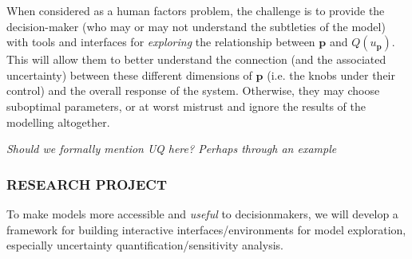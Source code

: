 \documentclass[a4paper,fontsize=12pt]{scrartcl}
\begin{document}
When considered as a human factors problem, the challenge is to provide
the decision-maker (who may or may not understand the subtleties of
the model) with tools and interfaces for \emph{exploring} the
relationship between $\mathbf{p}$ and $Q(u_{\mathbf{p}})$. This will allow them to better
understand the connection (and the associated uncertainty) between
these different dimensions of $\mathbf{p}$ (i.e. the knobs under their control)
and the overall response of the system. Otherwise, they may choose
suboptimal parameters, or at worst mistrust and ignore the results of
the modelling altogether.

\emph{Should we formally mention UQ here? Perhaps through an example}

\subsubsection*{RESEARCH PROJECT}

To make models more accessible and \emph{useful} to decisionmakers, we
will develop a framework for building interactive
interfaces/environments for model exploration, especially uncertainty
quantification/sensitivity analysis.
\end{document}
